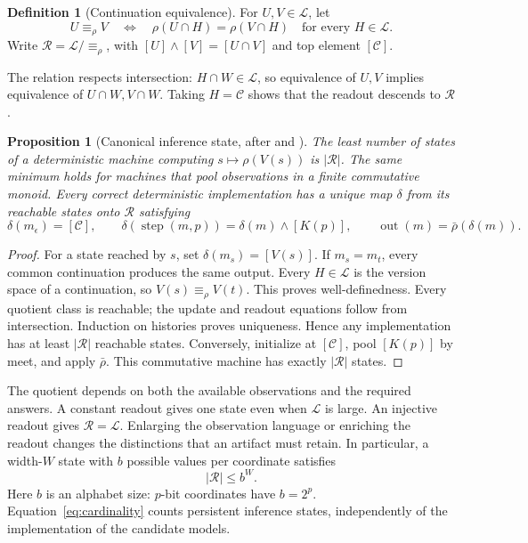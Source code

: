 \documentclass{article}
\newtheorem{proposition}[proposition]{Proposition}
\theoremstyle{definition}
\newtheorem{definition}[definition]{Definition}
\newcommand{\C}{\mathcal C}
\newcommand{\Latt}{\mathcal L}
\newcommand{\R}{\mathcal R}
\begin{document}
\begin{definition}[Continuation equivalence]\label{def:nerode}
For $U,V\in\Latt$, let
\begin{equation}
 U\equiv_\rho V
 \quad\Longleftrightarrow\quad
 \rho(U\cap H)=\rho(V\cap H)\quad\text{for every }H\in\Latt.
 \label{eq:nerode}
\end{equation}
Write $\R=\Latt/{\equiv_\rho}$, with $[U]\wedge[V]=[U\cap V]$ and top element $[\C]$.
\end{definition}
The relation respects intersection: $H\cap W\in\Latt$, so equivalence of $U,V$ implies equivalence of $U\cap W,V\cap W$. Taking $H=\C$ shows that the readout descends to $\R$.

\begin{proposition}[Canonical inference state, after \citet{moore1956} and \citet{nerode1958}]\label{thm:canonical}
The least number of states of a deterministic machine computing $s\mapsto\rho(V(s))$ is $|\R|$. The same minimum holds for machines that pool observations in a finite commutative monoid. Every correct deterministic implementation has a unique map $\delta$ from its reachable states onto $\R$ satisfying
\begin{equation}
 \delta(m_\epsilon)=[\C],\qquad
 \delta(\operatorname{step}(m,p))=\delta(m)\wedge[K(p)],
 \qquad \operatorname{out}(m)=\bar\rho(\delta(m)).
 \label{eq:simulation}
\end{equation}
\end{proposition}
\begin{proof}
For a state reached by $s$, set $\delta(m_s)=[V(s)]$. If $m_s=m_t$, every common continuation produces the same output. Every $H\in\Latt$ is the version space of a continuation, so $V(s)\equiv_\rho V(t)$. This proves well-definedness. Every quotient class is reachable; the update and readout equations follow from intersection. Induction on histories proves uniqueness. Hence any implementation has at least $|\R|$ reachable states. Conversely, initialize at $[\C]$, pool $[K(p)]$ by meet, and apply $\bar\rho$. This commutative machine has exactly $|\R|$ states.
\end{proof}

The quotient depends on both the available observations and the required answers. A constant readout gives one state even when $\Latt$ is large. An injective readout gives $\R=\Latt$. Enlarging the observation language or enriching the readout changes the distinctions that an artifact must retain. In particular, a width-$W$ state with $b$ possible values per coordinate satisfies
\begin{equation}
 |\R|\le b^W.\label{eq:cardinality}
\end{equation}
Here $b$ is an alphabet size: $p$-bit coordinates have $b=2^p$. Equation~\eqref{eq:cardinality} counts persistent inference states, independently of the implementation of the candidate models.
\end{document}
